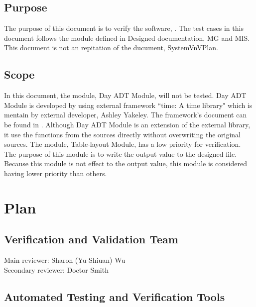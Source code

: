 \documentclass[12pt, titlepage]{article}
\begin{document}
\subsection{Purpose}

The purpose of this document is to verify the software, \progname{}. The test cases in this document follows the module defined in Designed documentation, MG and MIS. This document is not an repitation of the ducument, SystemVnVPlan.

\subsection{Scope}

In this document, the module, Day ADT Module, will not be tested. Day ADT Module is developed by using external framework ``time: A time library" which is mentain by external developer, Ashley Yakeley. The framework's  document can be found in \cite{time}. Although Day ADT Module is an extension of the external library, it use the functions from the sources directly without overwriting the original sources. The module,  Table-layout Module, has a low priority for verification. The purpose of this module is 
to write the output value to the designed file. Because this module is not effect to the output value, this module is considered having lower priority than others.


\section{Plan}
	
\subsection{Verification and Validation Team}
Main reviewer: Sharon (Yu-Shiuan) Wu\\ 
Secondary reviewer: Doctor Smith\\

\subsection{Automated Testing and Verification Tools}
\end{document}
